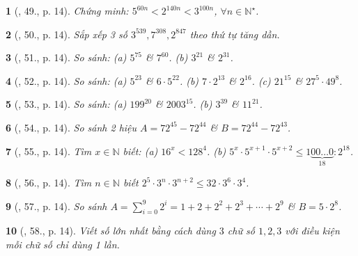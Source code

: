\documentclass{article}
\newtheorem{baitoan}{}
\begin{document}
\begin{baitoan}[\cite{Tuyen_Toan_6}, 49., p. 14]
	Chứng minh: $5^{60n} < 2^{140n} < 3^{100n}$, $\forall n\in\mathbb{N}^\star$.
\end{baitoan}

\begin{baitoan}[\cite{Tuyen_Toan_6}, 50., p. 14]
	Sắp xếp 3 số $3^{539},7^{308},2^{847}$ theo thứ tự tăng dần.
\end{baitoan}

\begin{baitoan}[\cite{Tuyen_Toan_6}, 51., p. 14]
	So sánh: (a) $5^{75}$ \& $7^{60}$. (b) $3^{21}$ \& $2^{31}$.
\end{baitoan}

\begin{baitoan}[\cite{Tuyen_Toan_6}, 52., p. 14]
	So sánh: (a) $5^{23}$ \& $6\cdot5^{22}$. (b) $7\cdot2^{13}$ \& $2^{16}$. (c) $21^{15}$ \& $27^5\cdot49^8$.
\end{baitoan}

\begin{baitoan}[\cite{Tuyen_Toan_6}, 53., p. 14]
	So sánh: (a) $199^{20}$ \& $2003^{15}$. (b) $3^{39}$ \& $11^{21}$.
\end{baitoan}

\begin{baitoan}[\cite{Tuyen_Toan_6}, 54., p. 14]
	So sánh 2 hiệu $A = 72^{45} - 72^{44}$ \& $B = 72^{44} - 72^{43}$.
\end{baitoan}

\begin{baitoan}[\cite{Tuyen_Toan_6}, 55., p. 14]
	Tìm $x\in\mathbb{N}$ biết: (a) $16^x < 128^4$. (b) $5^x\cdot5^{x + 1}\cdot5^{x + 2}\le1\underbrace{00\ldots0}_{18}:2^{18}$.
\end{baitoan}

\begin{baitoan}[\cite{Tuyen_Toan_6}, 56., p. 14]
	Tìm $n\in\mathbb{N}$ biết $2^5\cdot3^n\cdot3^{n + 2}\le32\cdot3^6\cdot3^4$.
\end{baitoan}

\begin{baitoan}[\cite{Tuyen_Toan_6}, 57., p. 14]
	So sánh $A = \sum_{i=0}^9 2^i = 1 + 2 + 2^2 + 2^3 + \cdots + 2^9$ \& $B = 5\cdot2^8$.
\end{baitoan}

\begin{baitoan}[\cite{Tuyen_Toan_6}, 58., p. 14]
	Viết số lớn nhất bằng cách dùng $3$ chữ số $1,2,3$ với điều kiện mỗi chữ số chỉ dùng 1 lần.
\end{baitoan}
\end{document}

